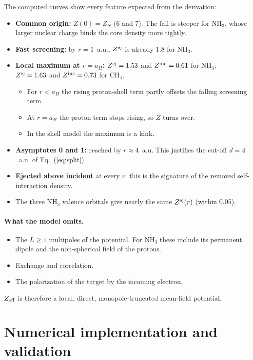 \documentclass[11pt,a4paper]{article}
\newcommand{\NH}{NH$_3$}
\newcommand{\CH}{CH$_4$}
\begin{document}
The computed curves show every feature expected from the derivation:
\begin{itemize}
\item \textbf{Common origin:} $Z(0)=Z_N$ (6 and 7). The fall is steeper for \NH, whose larger
  nuclear charge binds the core density more tightly.
\item \textbf{Fast screening:} by $r=1$~a.u., $Z^{\rm ej}$ is already 1.8 for \NH.
\item \textbf{Local maximum at $r=a_H$:} $Z^{\rm ej}=1.53$ and $Z^{\rm inc}=0.61$ for \NH;
  $Z^{\rm ej}=1.63$ and $Z^{\rm inc}=0.73$ for \CH.
  \begin{itemize}
  \item For $r<a_H$ the rising proton-shell term partly offsets the falling screening term.
  \item At $r=a_H$ the proton term stops rising, so $Z$ turns over.
  \item In the shell model the maximum is a kink.
  \end{itemize}
\item \textbf{Asymptotes 0 and 1:} reached by $r\approx4$~a.u. This justifies the cut-off $d=4$~a.u.
  of Eq.~(\ref{eq:split}).
\item \textbf{Ejected above incident} at every $r$: this is the signature of the removed
  self-interaction density.
\item The three \NH{} valence orbitals give nearly the same $Z^{\rm ej}(r)$ (within 0.05).
\end{itemize}

\paragraph{What the model omits.}
\begin{itemize}
\item The $L\ge1$ multipoles of the potential. For \NH{} these include its permanent dipole and
  the non-spherical field of the protons.
\item Exchange and correlation.
\item The polarization of the target by the incoming electron.
\end{itemize}
$Z_{\rm eff}$ is therefore a local, direct, monopole-truncated mean-field potential.

\section{Numerical implementation and validation}\label{sec:numerics}
\end{document}

